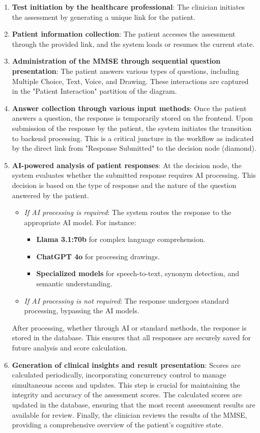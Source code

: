 \begin{enumerate}
    \item \textbf{Test initiation by the healthcare professional}: The clinician initiates the assessment by generating a unique link for the patient.
    \item \textbf{Patient information collection}: The patient accesses the assessment through the provided link, and the system loads or resumes the current state.
    \item \textbf{Administration of the MMSE through sequential question presentation}: The patient answers various types of questions, including Multiple Choice, Text, Voice, and Drawing. These interactions are captured in the "Patient Interaction" partition of the diagram.
    \item \textbf{Answer collection through various input methods}: Once the patient answers a question, the response is temporarily stored on the frontend. Upon submission of the response by the patient, the system initiates the transition to backend processing. This is a critical juncture in the workflow as indicated by the direct link from "Response Submitted" to the decision node (diamond).
    \item \textbf{AI-powered analysis of patient responses}: At the decision node, the system evaluates whether the submitted response requires AI processing. This decision is based on the type of response and the nature of the question answered by the patient.
    \begin{itemize}
        \item \textit{If AI processing is required}: The system routes the response to the appropriate AI model. For instance:
        \begin{itemize}
            \item \textbf{Llama 3.1:70b} for complex language comprehension.
            \item \textbf{ChatGPT 4o} for processing drawings.
            \item \textbf{Specialized models} for speech-to-text, synonym detection, and semantic understanding.
        \end{itemize}
        \item \textit{If AI processing is not required}: The response undergoes standard processing, bypassing the AI models.
    \end{itemize}
    After processing, whether through AI or standard methods, the response is stored in the database. This ensures that all responses are securely saved for future analysis and score calculation.
    \item \textbf{Generation of clinical insights and result presentation}: Scores are calculated periodically, incorporating concurrency control to manage simultaneous access and updates. This step is crucial for maintaining the integrity and accuracy of the assessment scores. The calculated scores are updated in the database, ensuring that the most recent assessment results are available for review. Finally, the clinician reviews the results of the MMSE, providing a comprehensive overview of the patient’s cognitive state.
\end{enumerate}

